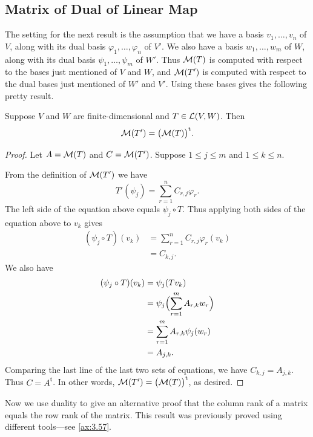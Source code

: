 \subsection{Matrix of Dual of Linear Map}

The setting for the next result is the assumption that we have a basis
$v_1,\dots,v_n$ of $V$, along with its dual basis $\varphi_1,\dots,\varphi_n$ of
$V'$. We also have a basis $w_1,\dots,w_m$ of $W$, along with its dual basis
$\psi_1,\dots,\psi_m$ of $W'$. Thus $\mathcal{M}(T)$ is computed with respect to the
bases just mentioned of $V$ and $W$, and $\mathcal{M}(T')$ is computed with respect to
the dual bases just mentioned of $W'$ and $V'$. Using these bases gives the
following pretty result.

\begin{result}\label{ax:3.132}
Suppose $V$ and $W$ are finite-dimensional and $T\in\mathcal{L}(V,W)$. Then
\[ \mathcal{M}(T') = \bigl(\mathcal{M}(T)\bigr)^{\mathrm{t}}. \]
\end{result}

\begin{proof}
Let $A=\mathcal{M}(T)$ and $C=\mathcal{M}(T')$. Suppose $1\le j\le m$ and $1\le k\le n$.

From the definition of $\mathcal{M}(T')$ we have
\[ T'(\psi_j) = \sum_{r=1}^n C_{r,j}\varphi_r. \]
The left side of the equation above equals $\psi_j\circ T$. Thus applying both
sides of the equation above to $v_k$ gives
\begin{align*}
(\psi_j\circ T)(v_k) &= \sum_{r=1}^n C_{r,j}\varphi_r(v_k)\\
                     &= C_{k,j}.
\end{align*}
We also have
\begin{align*}
(\psi_j\circ T)(v_k) &= \psi_j(Tv_k)\\
  &= \psi_j\Bigl(\sum_{r=1}^m A_{r,k}w_r\Bigr)\\
  &= \sum_{r=1}^m A_{r,k}\psi_j(w_r)\\
  &= A_{j,k}.
\end{align*}
Comparing the last line of the last two sets of equations, we have
$C_{k,j}=A_{j,k}$. Thus $C=A^{\mathrm{t}}$. In other words,
$\mathcal{M}(T')=\bigl(\mathcal{M}(T)\bigr)^{\mathrm{t}}$, as desired.
\end{proof}

Now we use duality to give an alternative proof that the column rank of a matrix
equals the row rank of the matrix. This result was previously proved using
different tools---see \ref{ax:3.57}.

